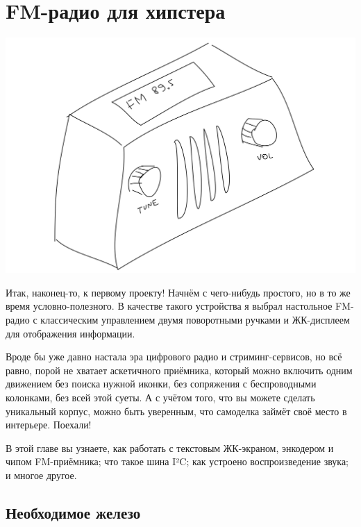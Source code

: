 \chapter{FM-радио для хипстера}

\includegraphics{sketches/fm-radio}

Итак, наконец-то, к первому проекту! Начнём с чего-нибудь простого, но в то же время условно-полезного. В качестве такого устройства я выбрал настольное FM-радио с классическим управлением двумя поворотными ручками и ЖК-дисплеем для отображения информации.

Вроде бы уже давно настала эра цифрового радио и стриминг-сервисов, но всё равно, порой не хватает аскетичного приёмника, который можно включить одним движением без поиска нужной иконки, без сопряжения с беспроводными колонками, без всей этой суеты. А с учётом того, что вы можете сделать уникальный корпус, можно быть уверенным, что самоделка займёт своё место в интерьере. Поехали!


В этой главе вы узнаете, как работать с текстовым ЖК-экраном, энкодером и чипом FM-приёмника; что такое шина I²C; как устроено воспроизведение звука; и многое другое.

\section{Необходимое железо}


